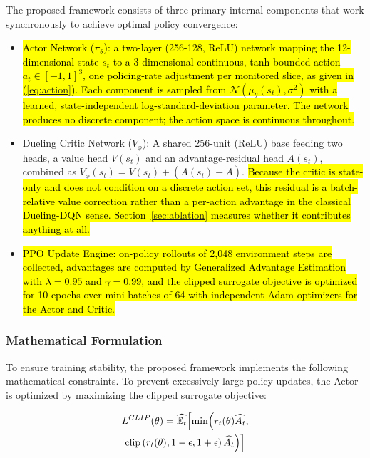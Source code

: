 \documentclass[conference]{IEEEtran}
\newcommand{\rev}[1]{\hl{#1}}
\newcommand{\m}[1]{\mbox{$#1$}}
\begin{document}
The proposed framework consists of three primary internal components that work synchronously to achieve optimal policy convergence:

\begin{itemize}
\item
  \rev{Actor Network (\m{\pi_{\theta}}): a two-layer (256-128, ReLU) network mapping the 12-dimensional state \m{s_{t}} to a 3-dimensional continuous, tanh-bounded action \m{a_{t} \in [-1,1]^3}, one policing-rate adjustment per monitored slice, as given in (\ref{eq:action}). Each component is sampled from \m{\mathcal{N}(\mu_\theta(s_t), \sigma^2)} with a learned, state-independent log-standard-deviation parameter. The network produces no discrete component; the action space is continuous throughout.}
\item
  Dueling Critic Network (\(V_{\phi}\)): A shared 256-unit (ReLU) base feeding two heads, a value head \(V(s_t)\) and an advantage-residual head \(A(s_t)\), combined as \(V_\phi(s_t) = V(s_t) + \left(A(s_t) - \bar{A}\right)\). \rev{Because the critic is state-only and does not condition on a discrete action set, this residual is a batch-relative value correction rather than a per-action advantage in the classical Dueling-DQN sense. Section~\ref{sec:ablation} measures whether it contributes anything at all.}
\item
  \rev{PPO Update Engine: on-policy rollouts of 2,048 environment steps are collected, advantages are computed by Generalized Advantage Estimation with \m{\lambda=0.95} and \m{\gamma=0.99}, and the clipped surrogate objective is optimized for 10 epochs over mini-batches of 64 with independent Adam optimizers for the Actor and Critic.}
\end{itemize}

\subsubsection{Mathematical Formulation}

To ensure training stability, the proposed framework implements the following mathematical constraints. To prevent excessively large policy updates, the Actor is optimized by maximizing the clipped surrogate objective:

\begin{multline}\label{eq:clip}
L^{CLIP}(\theta) = \widehat{\mathbb{E}_{t}}\Bigl\lbrack \min\Bigl( r_{t}(\theta)\widehat{A_{t}}, \\
\text{clip}\left( r_{t}(\theta),1 - \epsilon,1 + \epsilon \right)\widehat{A_{t}} \Bigr) \Bigr\rbrack
\end{multline}
\end{document}

